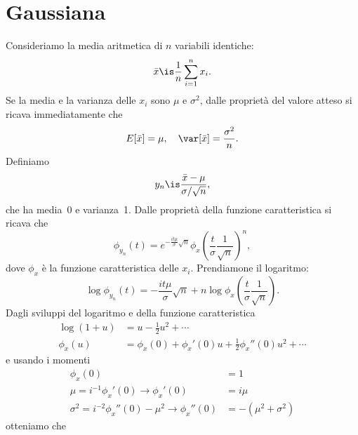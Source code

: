 
\section{Gaussiana}

Consideriamo la media aritmetica di $n$ variabili identiche:
\begin{equation*}
	\bar x \is \frac1n \sum_{i=1}^n x_i.
\end{equation*}
Se la media e la varianza delle $x_i$ sono $\mu$ e $\sigma^2$,
dalle proprietà del valore atteso si ricava immediatamente che
\begin{equation*}
	E[\bar x] = \mu, \quad \var[\bar x] = \frac{\sigma^2}{n}.
\end{equation*}
Definiamo
\begin{equation*}
	y_n \is \frac{\bar x - \mu}{\sigma / \sqrt n},
\end{equation*}
che ha media~0 e varianza~1.
Dalle proprietà della funzione caratteristica si ricava che
\begin{equation*}
	\phi_{y_n}(t) = e^{-\frac{it\mu}{\sigma}\sqrt n} \phi_x\left(\frac t\sigma \frac1{\sqrt n}\right)^n,
\end{equation*}
dove $\phi_x$ è la funzione caratteristica delle $x_i$. Prendiamone il logaritmo:
\begin{equation*}
	\log\phi_{y_n}(t) = -\frac{it\mu}{\sigma}\sqrt n + n\log\phi_x\left(\frac t\sigma \frac1{\sqrt n}\right).
\end{equation*}
Dagli sviluppi del logaritmo e della funzione caratteristica
\begin{align*}
	\log(1+u) &= u - \frac12 u^2 + \dotsb \\
	\phi_x(u) &= \phi_x(0) + \phi_x'(0)u + \frac12 \phi_x''(0) u^2 + \dotsb
\end{align*}
e usando i momenti
\begin{align*}
	\phi_x(0) &= 1 \\
	\mu = i^{-1}\phi_x'(0) \rightarrow \phi_x'(0) &= i\mu \\
	\sigma^2 = i^{-2}\phi_x''(0) - \mu^2 \rightarrow \phi_x''(0) &= -(\mu^2+\sigma^2)
\end{align*}
otteniamo che
